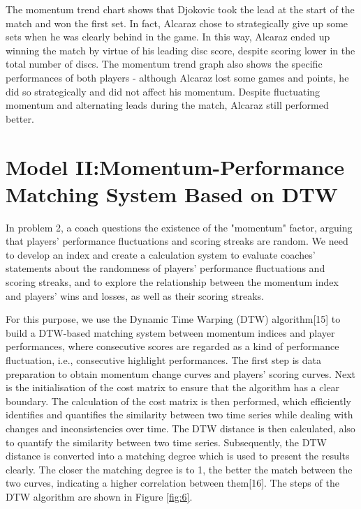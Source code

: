 \documentclass[12pt]{article}  %
\begin{document}
The momentum trend chart shows that Djokovic took the lead at the start of the match and won the first set. In fact, Alcaraz chose to strategically give up some sets when he was clearly behind in the game. In this way, Alcaraz ended up winning the match by virtue of his leading disc score, despite scoring lower in the total number of discs. The momentum trend graph also shows the specific performances of both players - although Alcaraz lost some games and points, he did so strategically and did not affect his momentum. Despite fluctuating momentum and alternating leads during the match, Alcaraz still performed better.

\section{Model II:Momentum-Performance Matching System Based on DTW}
In problem 2, a coach questions the existence of the "momentum" factor, arguing that players' performance fluctuations and scoring streaks are random. We need to develop an index and create a calculation system to evaluate coaches' statements about the randomness of players' performance fluctuations and scoring streaks, and to explore the relationship between the momentum index and players' wins and losses, as well as their scoring streaks.

For this purpose, we use the Dynamic Time Warping (DTW) algorithm[15] to build a DTW-based matching system between momentum indices and player performances, where consecutive scores are regarded as a kind of performance fluctuation, i.e., consecutive highlight performances. The first step is data preparation to obtain momentum change curves and players' scoring curves. Next is the initialisation of the cost matrix to ensure that the algorithm has a clear boundary. The calculation of the cost matrix is then performed, which efficiently identifies and quantifies the similarity between two time series while dealing with changes and inconsistencies over time. The DTW distance is then calculated, also to quantify the similarity between two time series. Subsequently, the DTW distance is converted into a matching degree which is used to present the results clearly. The closer the matching degree is to 1, the better the match between the two curves, indicating a higher correlation between them[16]. The steps of the DTW algorithm are shown in Figure \ref{fig:6}.
\end{document}
